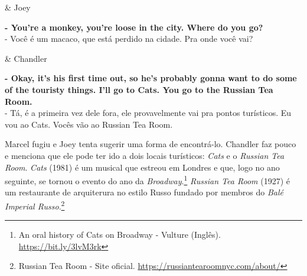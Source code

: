 \begin{tcolorbox}[enhanced,center upper,
    drop fuzzy shadow southeast, boxrule=0.3pt,
    lower separated=false, breakable,
    colframe=black!30!dialogoBorder,colback=white]
\begin{minipage}[c]{0.16\linewidth}
   & \centering \scriptsize{Joey}
\end{minipage}
\hfill
\begin{minipage}[c]{0.8\linewidth}
  \textbf{- You're a monkey, you're loose in the city. Where do you go?}\\
  - Você é um macaco, que está perdido na cidade. Pra onde você vai?
\end{minipage}

\medskip
\begin{minipage}[c]{0.16\linewidth}
   & \centering \scriptsize{Chandler}
\end{minipage}
\hfill
\begin{minipage}[c]{0.8\linewidth}
  \textbf{- Okay, it's his first time out, so he's probably gonna want to do some of the touristy things. I'll go to Cats. You go to the Russian Tea Room.}\\
  - Tá, é a primeira vez dele fora, ele provavelmente vai pra pontos turísticos. Eu vou ao Cats. Vocês vão ao Russian Tea Room.
\end{minipage}
\end{tcolorbox}

Marcel fugiu e Joey tenta sugerir uma forma de encontrá-lo. Chandler faz
pouco e menciona que ele pode ter ido a dois locais turísticos:
\emph{Cats} e o \emph{Russian Tea Room}. \emph{Cats} (1981) é um musical
que estreou em Londres e que, logo no ano seguinte, se tornou o evento
do ano da \emph{Broadway}.\footnote{\sloppy An oral history of Cats on Broadway - Vulture (Inglês). \url{https://bit.ly/3lvM3rk}}
\emph{Russian Tea Room} (1927) é um restaurante de arquiterura no estilo
Russo fundado por membros do \emph{Balé Imperial Russo}.\footnote{\sloppy Russian Tea Room - Site oficial. \url{https://russiantearoomnyc.com/about/}}

